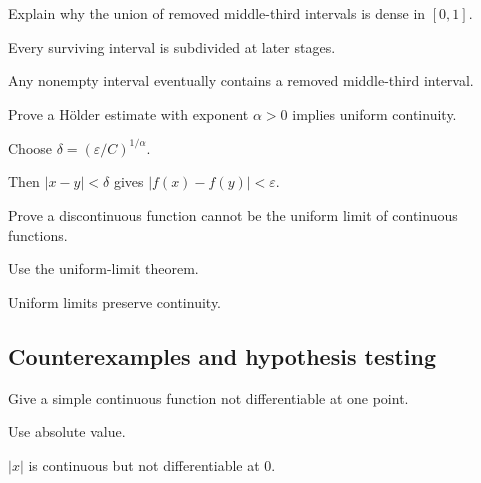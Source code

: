 \begin{exercise}\label{exr:ii15-expand-07}
Explain why the union of removed middle-third intervals is dense in \([0,1]\).
\end{exercise}
\begin{hint}
Every surviving interval is subdivided at later stages.
\end{hint}
\begin{solution}
Any nonempty interval eventually contains a removed middle-third interval.
\end{solution}

\begin{exercise}\label{exr:ii15-expand-08}
Prove a Hölder estimate with exponent \(\alpha>0\) implies uniform continuity.
\end{exercise}
\begin{hint}
Choose \(\delta=(\varepsilon/C)^{1/\alpha}\).
\end{hint}
\begin{solution}
Then \(|x-y|<\delta\) gives \(|f(x)-f(y)|<\varepsilon\).
\end{solution}

\begin{exercise}\label{exr:ii15-expand-09}
Prove a discontinuous function cannot be the uniform limit of continuous functions.
\end{exercise}
\begin{hint}
Use the uniform-limit theorem.
\end{hint}
\begin{solution}
Uniform limits preserve continuity.
\end{solution}

\subsection*{Counterexamples and hypothesis testing}

\begin{exercise}\label{exr:ii15-expand-10}
Give a simple continuous function not differentiable at one point.
\end{exercise}
\begin{hint}
Use absolute value.
\end{hint}
\begin{solution}
\(|x|\) is continuous but not differentiable at \(0\).
\end{solution}

